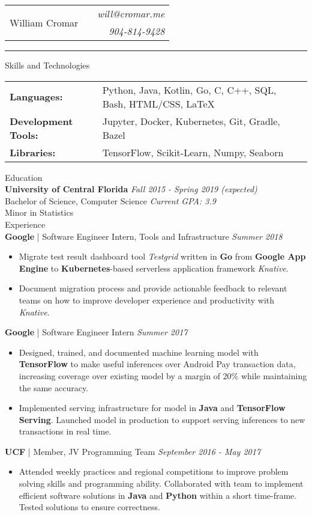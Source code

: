 \documentclass[letterpaper,11pt,oneside]{article}
\newcommand{\mkheader}[3]{
  {\fontfamily{pag}\selectfont
  \begin{tabularx}{\textwidth}{lXr}
    \multirow{2}{*}{\Huge #1} && \emph{#2}
    \\ && \emph{#3}
  \end{tabularx}
  }
  \vspace{2pt}
  \hrule
}
\newcommand{\resheader}[2][]{
  \vspace{9pt}
  {\LARGE #2} #1
  \\
}
\newcommand{\ressubheader}[3][]{
  \vspace{6pt}
  {\large \textbf{#2} #1} \hfill \emph{#3}
  \\
}
\newcommand{\resskill}[1]{\textbf{#1}}
\begin{document}
\mkheader{William Cromar}{will@cromar.me}{904-814-9428}

\resheader{Skills and Technologies}
\vspace{6pt}
\begin{tabular}{>{\bfseries}l@{\hskip .25cm} l}
  Languages: & Python, Java, Kotlin, Go, C, C++, SQL, Bash, HTML/CSS, LaTeX \\
  Development Tools: & Jupyter, Docker, Kubernetes, Git, Gradle, Bazel \\
  Libraries: & TensorFlow, Scikit-Learn, Numpy, Seaborn
\end{tabular}


\resheader{Education}
\ressubheader{University of Central Florida}{Fall 2015 - Spring 2019 (expected)}
Bachelor of Science, Computer Science \hfill \emph{Current GPA: 3.9} \\
Minor in Statistics \\

\resheader{Experience}
\ressubheader[| Software Engineer Intern, Tools and Infrastructure]{Google}{Summer 2018}
\begin{itemize}
  \item Migrate test result dashboard tool \emph{Testgrid} written in \resskill{Go} from \resskill{Google App Engine} to \resskill{Kubernetes}-based serverless application framework \emph{Knative}.
  \item Document migration process and provide actionable feedback to relevant teams on how to improve developer experience and productivity with \emph{Knative}.
\end{itemize}

\ressubheader[| Software Engineer Intern]{Google}{Summer 2017}
\begin{itemize}
  \item Designed, trained, and documented machine learning model with \resskill{TensorFlow} to make useful inferences over Android Pay transaction data, increasing coverage over existing model by a margin of 20\% while maintaining the same accuracy.
  \item Implemented serving infrastructure for model in \resskill{Java} and \resskill{TensorFlow Serving}. Launched model in production to support serving inferences to new transactions in real time.
\end{itemize}

\ressubheader[| Member, JV Programming Team]{UCF}{September 2016 - May 2017}
\begin{itemize}
  \item Attended weekly practices and regional competitions to improve problem solving skills and programming ability. Collaborated with team to implement efficient software solutions in \resskill{Java} and \resskill{Python} within a short time-frame. Tested solutions to ensure correctness.
\end{itemize}
\end{document}
